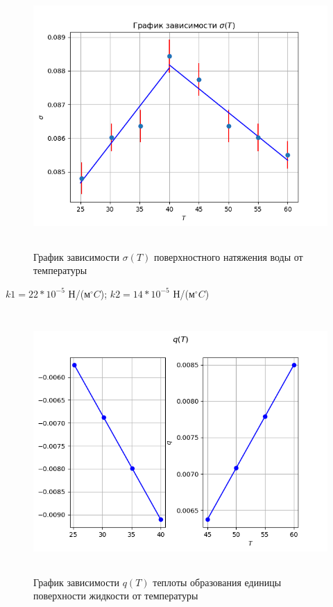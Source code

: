 \begin{figure}[h]
    \centering 
    \includegraphics[height=10cm]{plot1.png} 
    \caption{График зависимости $\sigma (T)$ поверхностного натяжения 
            воды от температуры} 
    \label{fig:sigmaT} 
\end{figure} 
$k1 = 22*10^{-5}$ Н/(м$^\circ C$);     
$k2 = 14*10^{-5}$ Н/(м$^\circ C$)\\

\begin{figure}[h!]
    \centering 
    \includegraphics[height=10cm]{plot2.png} 
    \caption{График зависимости $q (T)$ теплоты образования единицы  
            поверхности жидкости от температуры} 
    \label{fig:qT} 
\end{figure} 

